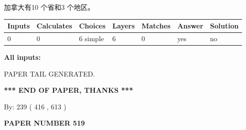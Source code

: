 \documentclass{ctexart}
\begin{document}
 
加拿大有10 个省和3 个地区。
 
 
\noindent{}
 
 
   
   
   
   
\noindent\begin{tabular}{|l|l|l|l|l|l|l|}
 \hline
Inputs & Calculates & Choices & Layers & Matches & Answer & Solution \\ \hline
 0  & 
 0  & 
 6
  simple  
  & 
 6  & 
 0  & 
  yes & 
  no 
  \\ \hline
 \end{tabular}
   
   
   
   
\noindent{}
   
   
   
   
\noindent\vspace{0.1in}\hspace{-0.08in} {\textbf{\Large{All inputs: }}}
   
   
   
   
   
   
 \vspace{0.2in}
 
   
   
\vspace{2.0in} PAPER TAIL GENERATED.
   
   
   
   
\vspace{1.0in} 
{\textbf{\large{ *** END OF PAPER, THANKS *** }}} 
   
   
\hspace{1.0in} By: 
 239 ( 416 ,  613 )
   
   
   
   
\newpage 
\setcounter{page}{ 
   519001 } 
   
   
   
   
 {\textbf{ \Large{ PAPER NUMBER  519  }}}
   
   
\vspace{0.2in}
   
   
   
   
   
   
   
\end{document}

